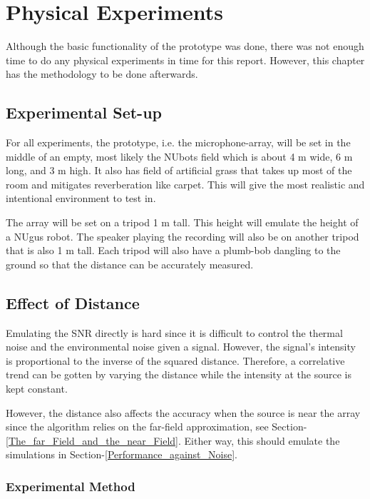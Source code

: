 \documentclass[notitlepage]{report}
\begin{document}
\chapter{Physical Experiments} \label{Physical_Experiments}

Although the basic functionality of the prototype was done, there was not enough time to do any physical experiments in time for this report. However, this chapter has the methodology to be done afterwards.

\section{Experimental Set-up}

For all experiments, the prototype, i.e. the microphone-array, will be set in the middle of an empty, most likely the NUbots field which is about 4 \si{m} wide, 6 \si{m} long, and 3 \si{m} high. It also has field of artificial grass that takes up most of the room and mitigates reverberation like carpet. This will give the most realistic and intentional environment to test in.

The array will be set on a tripod 1 \si{m} tall. This height will emulate the height of a NUgus robot. The speaker playing the recording will also be on another tripod that is also 1 \si{m} tall. Each tripod will also have a plumb-bob dangling to the ground so that the distance can be accurately measured. 

\section{Effect of Distance}

Emulating the SNR directly is hard since it is difficult to control the thermal noise and the environmental noise given a signal. However, the signal's intensity is proportional to the inverse of the squared distance. Therefore, a correlative trend can be gotten by varying the distance while the intensity at the source is kept constant.

However, the distance also affects the accuracy when the source is near the array since the algorithm relies on the far-field approximation, see Section-\ref{The_far_Field_and_the_near_Field}. Either way, this should emulate the simulations in Section-\ref{Performance_against_Noise}.

\subsection{Experimental Method}
\end{document}
